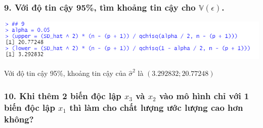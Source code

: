 \documentclass[a4paper]{article}
\theoremstyle{nonumberplain}
\begin{document}
\subsubsection*{9. Với độ tin cậy 95\%, tìm khoảng tin cậy cho $\mathbb{V}(\epsilon)$. }

\begin{center}
\includegraphics{bai3_9.PNG} 
\end{center}

Với độ tin cậy 95\%, khoảng tin cậy của $\hat{\sigma}^2$ là $\left(3.292832;20.77248\right)$

\subsubsection*{10. Khi thêm 2 biến độc lập $x_3$ và $x_2$ vào mô hình chỉ với 1 biến độc lập $x_1$ thì làm cho chất lượng ước lượng cao hơn không?}
\end{document}
